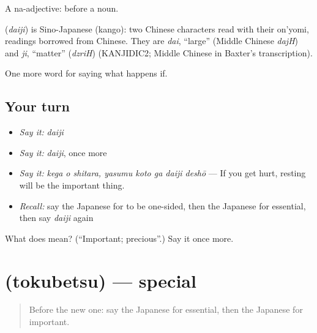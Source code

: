 A na-adjective:  before a noun.

\begin{cousinweb}
\textbf{} (\emph{daiji}) is Sino-Japanese (kango): two Chinese characters read with their on'yomi, readings borrowed from Chinese. They are \emph{dai}, \textquotedblleft{}large\textquotedblright{} (Middle Chinese \emph{dajH}) and \emph{ji}, \textquotedblleft{}matter\textquotedblright{} (\emph{dzriH}) (KANJIDIC2; Middle Chinese in Baxter's transcription).
\end{cousinweb}

\begin{grammarlens}[title={What you've built}]
One more word for saying what happens if.
\end{grammarlens}

\subsection*{Your turn}
\begin{itemize}
\raggedright
  \item \emph{Say it:} \emph{daiji}
  \item \emph{Say it:} \emph{daiji}, once more
  \item \emph{Say it:} \emph{kega o shitara, yasumu koto ga daiji deshō} — If you get hurt, resting will be the important thing.
  \item \emph{Recall:} say the Japanese for to be one-sided, then the Japanese for essential, then say \emph{daiji} again
\end{itemize}

\begin{tcolorbox}[breakable,colback=teal!4,colframe=teal!35!black,title={Before you move on}]
What does  mean? (\textquotedblleft{}Important; precious\textquotedblright{}.) Say it once more.
\end{tcolorbox}
\section[\texorpdfstring{\ja{とくべつ} (tokubetsu)}{とくべつ (tokubetsu)}]{ (tokubetsu) — special}

\label{lesson:JA-C369-tokubetsu}



\begin{quote}
Before the new one: say the Japanese for essential, then the Japanese for important.
\end{quote}

